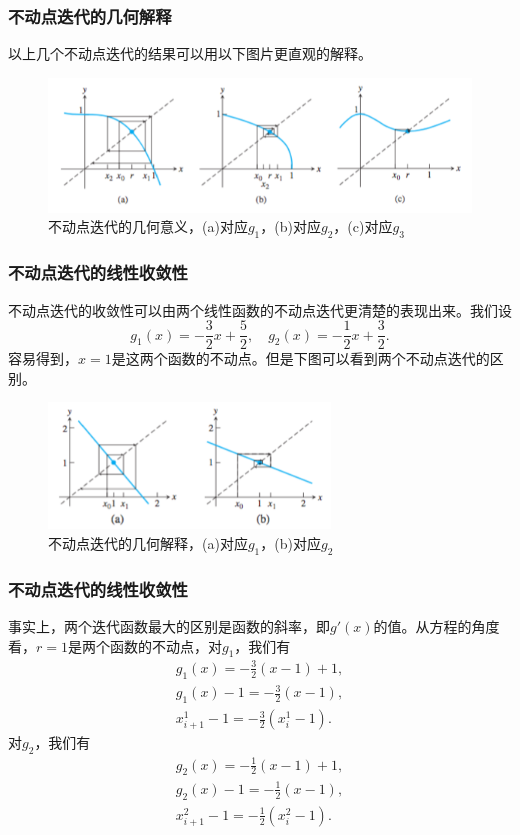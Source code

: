 \documentclass[10pt]{beamer}
\begin{document}
\begin{frame}
\frametitle{不动点迭代的几何解释}
以上几个不动点迭代的结果可以用以下图片更直观的解释。
\begin{figure}
\includegraphics[width=12cm]{figs/FPI_geometry_1.png} 
\caption{不动点迭代的几何意义，(a)对应$g_1$，(b)对应$g_2$，(c)对应$g_3$} 
\end{figure}
\end{frame}

\begin{frame}
\frametitle{不动点迭代的线性收敛性}
不动点迭代的收敛性可以由两个线性函数的不动点迭代更清楚的表现出来。我们设
\begin{equation}
g_1(x) = -\frac{3}{2} x + \frac{5}{2}, \quad g_2(x) = -\frac{1}{2}x + \frac{3}{2}.
\end{equation}
容易得到，$x = 1$是这两个函数的不动点。但是下图可以看到两个不动点迭代的区别。
\begin{figure}
\includegraphics[width=7.5cm]{figs/FPI_geometry_2.png} 
\caption{不动点迭代的几何解释，(a)对应$g_1$，(b)对应$g_2$} 
\end{figure}
\end{frame}


\begin{frame}
\frametitle{不动点迭代的线性收敛性}
事实上，两个迭代函数最大的区别是函数的斜率，即$g'(x)$的值。从方程的角度看，$r=1$是两个函数的不动点，对$g_1$，我们有
\begin{align}
g_1(x) = -\frac{3}{2}(x-1) +1, \nonumber \\
g_1(x)-1 = -\frac{3}{2}(x-1), \nonumber \\
x^1_{i+1} -1 = -\frac{3}{2}(x^1_i-1).
\end{align}
对$g_2$，我们有
\begin{align}
g_2(x) = -\frac{1}{2}(x-1) +1, \nonumber \\
g_2(x)-1 = -\frac{1}{2}(x-1), \nonumber \\
x^2_{i+1} -1 = -\frac{1}{2}(x^2_i-1).
\end{align}
\end{frame}
\end{document}
